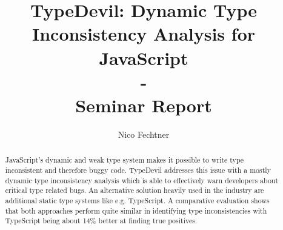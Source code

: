 \documentclass[runningheads,a4paper]{llncs}
\newcommand{\keywords}[1]{\par\addvspace\baselineskip

\noindent\keywordname\enspace\ignorespaces#1}
\begin{document}

\mainmatter  %

\title{TypeDevil: Dynamic Type Inconsistency Analysis for JavaScript\\-\\Seminar Report}


\author{Nico Fechtner}
%


%
%
\toctitle{}
\tocauthor{}
\maketitle
 \newpage
 \thispagestyle{empty}
\begin{abstract}
    JavaScript's dynamic and weak type system makes it possible to write type inconsistent and therefore buggy code. 
    TypeDevil addresses this issue with a mostly dynamic type inconsistency analysis which is able to effectively warn developers about critical type related bugs.
    An alternative solution heavily used in the industry are additional static type systems like e.g. TypeScript.
    A comparative evaluation shows that both approaches perform quite similar in identifying type inconsistencies with TypeScript being about 14\% better at finding true positives.
    \end{abstract}
    
\end{document}
